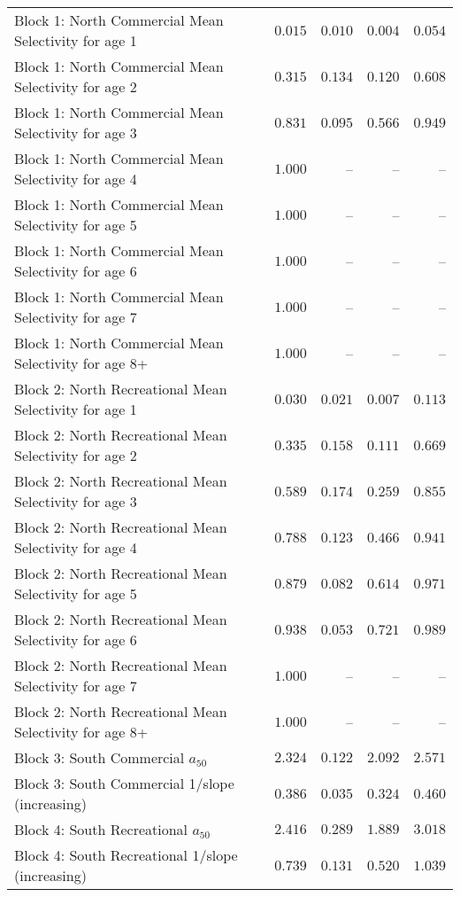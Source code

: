 \documentclass[
]{article}
\begin{document}
\begin{landscape}
\begin{longtable}[t]{lrrrr}
Block 1: North Commercial Mean Selectivity for age 1 & $0.015$ & $0.010$ & $0.004$ & $0.054$\\
Block 1: North Commercial Mean Selectivity for age 2 & $0.315$ & $0.134$ & $0.120$ & $0.608$\\
Block 1: North Commercial Mean Selectivity for age 3 & $0.831$ & $0.095$ & $0.566$ & $0.949$\\
Block 1: North Commercial Mean Selectivity for age 4 & $1.000$ & -- & -- & --\\
\addlinespace
Block 1: North Commercial Mean Selectivity for age 5 & $1.000$ & -- & -- & --\\
Block 1: North Commercial Mean Selectivity for age 6 & $1.000$ & -- & -- & --\\
Block 1: North Commercial Mean Selectivity for age 7 & $1.000$ & -- & -- & --\\
Block 1: North Commercial Mean Selectivity for age 8+ & $1.000$ & -- & -- & --\\
Block 2: North Recreational Mean Selectivity for age 1 & $0.030$ & $0.021$ & $0.007$ & $0.113$\\
\addlinespace
Block 2: North Recreational Mean Selectivity for age 2 & $0.335$ & $0.158$ & $0.111$ & $0.669$\\
Block 2: North Recreational Mean Selectivity for age 3 & $0.589$ & $0.174$ & $0.259$ & $0.855$\\
Block 2: North Recreational Mean Selectivity for age 4 & $0.788$ & $0.123$ & $0.466$ & $0.941$\\
Block 2: North Recreational Mean Selectivity for age 5 & $0.879$ & $0.082$ & $0.614$ & $0.971$\\
Block 2: North Recreational Mean Selectivity for age 6 & $0.938$ & $0.053$ & $0.721$ & $0.989$\\
\addlinespace
Block 2: North Recreational Mean Selectivity for age 7 & $1.000$ & -- & -- & --\\
Block 2: North Recreational Mean Selectivity for age 8+ & $1.000$ & -- & -- & --\\
Block 3: South Commercial $a_{50}$ & $2.324$ & $0.122$ & $2.092$ & $2.571$\\
Block 3: South Commercial 1/slope (increasing) & $0.386$ & $0.035$ & $0.324$ & $0.460$\\
Block 4: South Recreational $a_{50}$ & $2.416$ & $0.289$ & $1.889$ & $3.018$\\
\addlinespace
Block 4: South Recreational 1/slope (increasing) & $0.739$ & $0.131$ & $0.520$ & $1.039$\\

\end{longtable}
\end{landscape}
\end{document}
